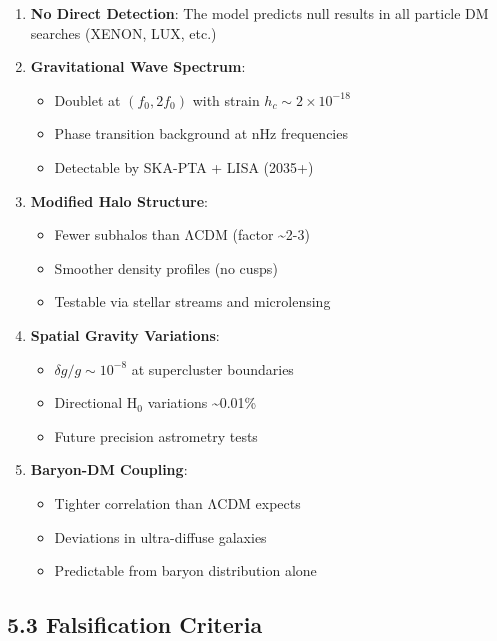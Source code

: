 \documentclass[
  11pt,
]{report}
\providecommand{\tightlist}{%
  \setlength{\itemsep}{0pt}\setlength{\parskip}{0pt}}
\begin{document}
\begin{enumerate}
\def\labelenumi{\arabic{enumi}.}
\item
  \textbf{No Direct Detection}: The model predicts null results in all
  particle DM searches (XENON, LUX, etc.)
\item
  \textbf{Gravitational Wave Spectrum}:

  \begin{itemize}
  \tightlist
  \item
    Doublet at \((f_0, 2f_0)\) with strain
    \(h_c \sim 2 \times 10^{-18}\)
  \item
    Phase transition background at nHz frequencies
  \item
    Detectable by SKA-PTA + LISA (2035+)
  \end{itemize}
\item
  \textbf{Modified Halo Structure}:

  \begin{itemize}
  \tightlist
  \item
    Fewer subhalos than ΛCDM (factor \textasciitilde2-3)
  \item
    Smoother density profiles (no cusps)
  \item
    Testable via stellar streams and microlensing
  \end{itemize}
\item
  \textbf{Spatial Gravity Variations}:

  \begin{itemize}
  \tightlist
  \item
    \(\delta g/g \sim 10^{-8}\) at supercluster boundaries
  \item
    Directional H\(_0\) variations \textasciitilde0.01\%
  \item
    Future precision astrometry tests
  \end{itemize}
\item
  \textbf{Baryon-DM Coupling}:

  \begin{itemize}
  \tightlist
  \item
    Tighter correlation than ΛCDM expects
  \item
    Deviations in ultra-diffuse galaxies
  \item
    Predictable from baryon distribution alone
  \end{itemize}
\end{enumerate}

\subsection{5.3 Falsification Criteria}\label{falsification-criteria}
\end{document}
